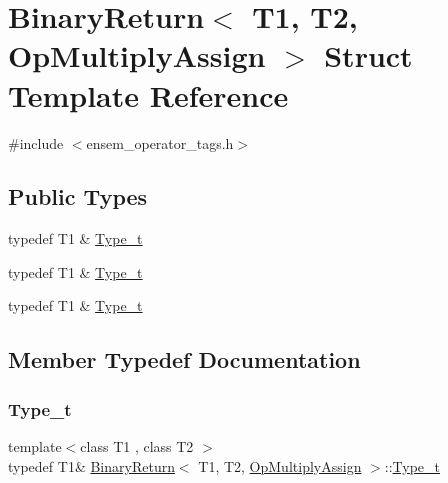 \hypertarget{structBinaryReturn_3_01T1_00_01T2_00_01OpMultiplyAssign_01_4}{}\section{Binary\+Return$<$ T1, T2, Op\+Multiply\+Assign $>$ Struct Template Reference}
\label{structBinaryReturn_3_01T1_00_01T2_00_01OpMultiplyAssign_01_4}


{\ttfamily \#include $<$ensem\+\_\+operator\+\_\+tags.\+h$>$}

\subsection*{Public Types}
\begin{DoxyCompactItemize}
\item 
typedef T1 \& \mbox{\hyperlink{structBinaryReturn_3_01T1_00_01T2_00_01OpMultiplyAssign_01_4_a87fa61c2114e9aa9f0550dc271144d42}{Type\+\_\+t}}
\item 
typedef T1 \& \mbox{\hyperlink{structBinaryReturn_3_01T1_00_01T2_00_01OpMultiplyAssign_01_4_a87fa61c2114e9aa9f0550dc271144d42}{Type\+\_\+t}}
\item 
typedef T1 \& \mbox{\hyperlink{structBinaryReturn_3_01T1_00_01T2_00_01OpMultiplyAssign_01_4_a87fa61c2114e9aa9f0550dc271144d42}{Type\+\_\+t}}
\end{DoxyCompactItemize}


\subsection{Member Typedef Documentation}
\mbox{\label{structBinaryReturn_3_01T1_00_01T2_00_01OpMultiplyAssign_01_4_a87fa61c2114e9aa9f0550dc271144d42}} 
\subsubsection{\texorpdfstring{Type\_t}{Type\_t}\hspace{0.1cm}{\footnotesize\ttfamily [1/3]}}
{\footnotesize\ttfamily template$<$class T1 , class T2 $>$ \\
typedef T1\& \mbox{\hyperlink{structBinaryReturn}{Binary\+Return}}$<$ T1, T2, \mbox{\hyperlink{structOpMultiplyAssign}{Op\+Multiply\+Assign}} $>$\+::\mbox{\hyperlink{structBinaryReturn_3_01T1_00_01T2_00_01OpMultiplyAssign_01_4_a87fa61c2114e9aa9f0550dc271144d42}{Type\+\_\+t}}}

